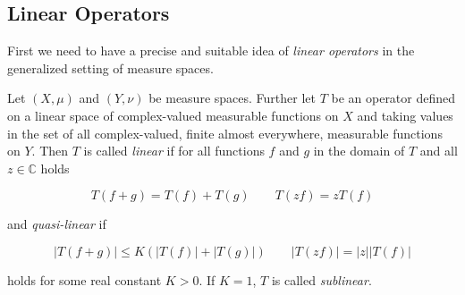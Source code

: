\subsection{Linear Operators}
First we need to have a precise and suitable idea of \emph{linear operators} in the generalized setting of measure spaces.
\vspace{2mm}
\begin{mdframed}
	\begin{definition}
		Let $(X,\mu)$ and $(Y,\nu)$ be measure spaces. Further let $T$ be an operator defined on a linear space of complex-valued measurable functions on $X$ and taking values in the set of all complex-valued, finite almost everywhere, measurable functions on $Y$. Then $T$ is called \emph{linear} if for all functions $f$ and $g$ in the domain of $T$ and all $z \in \mathbb{C}$ holds

		\begin{equation}
			T\left( f + g \right) = T(f) + T(g) \qquad T\left( zf \right) = zT(f)
			\label{eq:linear}
		\end{equation}

		and \emph{quasi-linear} if

		\begin{equation}
			\left| T\left( f + g \right) \right| \leqslant K \left( \left| T(f)\right| + \left| T(g)\right| \right) \qquad \left| T(zf) \right| = \left| z\right| \left| T(f)\right|
			\label{eq:quasilinear}
		\end{equation}

		holds for some real constant $K > 0$. If $K = 1$, $T$ is called \emph{sublinear}.
	\end{definition}
\end{mdframed}





\originalsectionstyle

